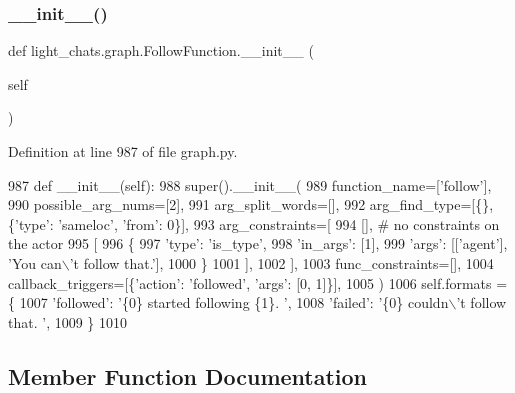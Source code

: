 \subsubsection{\texorpdfstring{\+\_\+\+\_\+init\+\_\+\+\_\+()}{\_\_init\_\_()}}
{\footnotesize\ttfamily def light\+\_\+chats.\+graph.\+Follow\+Function.\+\_\+\+\_\+init\+\_\+\+\_\+ (\begin{DoxyParamCaption}\item[{}]{self }\end{DoxyParamCaption})}



Definition at line 987 of file graph.\+py.


\begin{DoxyCode}
987     \textcolor{keyword}{def }\_\_init\_\_(self):
988         super().\_\_init\_\_(
989             function\_name=[\textcolor{stringliteral}{'follow'}],
990             possible\_arg\_nums=[2],
991             arg\_split\_words=[],
992             arg\_find\_type=[\{\}, \{\textcolor{stringliteral}{'type'}: \textcolor{stringliteral}{'sameloc'}, \textcolor{stringliteral}{'from'}: 0\}],
993             arg\_constraints=[
994                 [],  \textcolor{comment}{# no constraints on the actor}
995                 [
996                     \{
997                         \textcolor{stringliteral}{'type'}: \textcolor{stringliteral}{'is\_type'},
998                         \textcolor{stringliteral}{'in\_args'}: [1],
999                         \textcolor{stringliteral}{'args'}: [[\textcolor{stringliteral}{'agent'}], \textcolor{stringliteral}{'You can\(\backslash\)'t follow that.'}],
1000                     \}
1001                 ],
1002             ],
1003             func\_constraints=[],
1004             callback\_triggers=[\{\textcolor{stringliteral}{'action'}: \textcolor{stringliteral}{'followed'}, \textcolor{stringliteral}{'args'}: [0, 1]\}],
1005         )
1006         self.formats = \{
1007             \textcolor{stringliteral}{'followed'}: \textcolor{stringliteral}{'\{0\} started following \{1\}. '},
1008             \textcolor{stringliteral}{'failed'}: \textcolor{stringliteral}{'\{0\} couldn\(\backslash\)'t follow that. '},
1009         \}
1010 
\end{DoxyCode}


\subsection{Member Function Documentation}
\mbox{\label{classlight__chats_1_1graph_1_1FollowFunction_a6d1937938725b143930c10260adae130}} 
